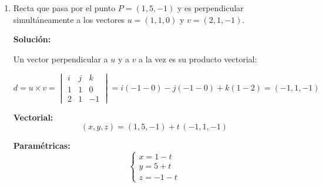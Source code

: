 \documentclass[12pt]{article}
\newcommand{\solucion}{%
    \vspace{0.8em}%
    \textbf{Solución:}%
    \vspace{0.8em}%
}
\begin{document}
\begin{enumerate}[label=\alph*.-]
\begin{enumerate}[label=\roman*)]
        \solucion

        La condición de perpendicularidad a un \emph{único} vector no
        determina una recta de manera unívoca: existen infinitas rectas por
        $P$ perpendiculares a $v$ (todas las contenidas en el plano que pasa
        por $P$ con normal $v$). Basta entonces elegir un vector director
        $d=(a,b,c)$ que cumpla $d\cdot v=0$:

        \[
        a+2b-3c=0
        \]

        Tomando $c=0$ y $a=2$, resulta $2+2b=0\Rightarrow b=-1$, es decir
        $d=(2,-1,0)$. En efecto, $d\cdot v=2-2+0=0$. \checkmark

        \textbf{Vectorial:}
        \[
        (x,y,z)=(2,5,-3)+t\,(2,-1,0)
        \]

        \textbf{Paramétricas:}
        \[
        \begin{cases}
        x=2+2t\\
        y=5-t\\
        z=-3
        \end{cases}
        \]

        \textbf{Simétricas:} como la tercera componente del director es nula,
        \[
        \boxed{\frac{x-2}{2}=\frac{y-5}{-1},\qquad z=-3}
        \]

        \item Recta que pasa por el punto $P=(1,5,-1)$ y es perpendicular
        simultáneamente a los vectores $u=(1,1,0)$ y $v=(2,1,-1)$.

        \solucion

        Un vector perpendicular a $u$ y a $v$ a la vez es su producto
        vectorial:

        \[
        d=u\times v=\begin{vmatrix}
        i & j & k\\
        1 & 1 & 0\\
        2 & 1 & -1
        \end{vmatrix}
        =i(-1-0)-j(-1-0)+k(1-2)=(-1,1,-1)
        \]

        \textbf{Vectorial:}
        \[
        (x,y,z)=(1,5,-1)+t\,(-1,1,-1)
        \]

        \textbf{Paramétricas:}
        \[
        \begin{cases}
        x=1-t\\
        y=5+t\\
        z=-1-t
        \end{cases}
        \]


\end{enumerate}
\end{enumerate}
\end{document}
